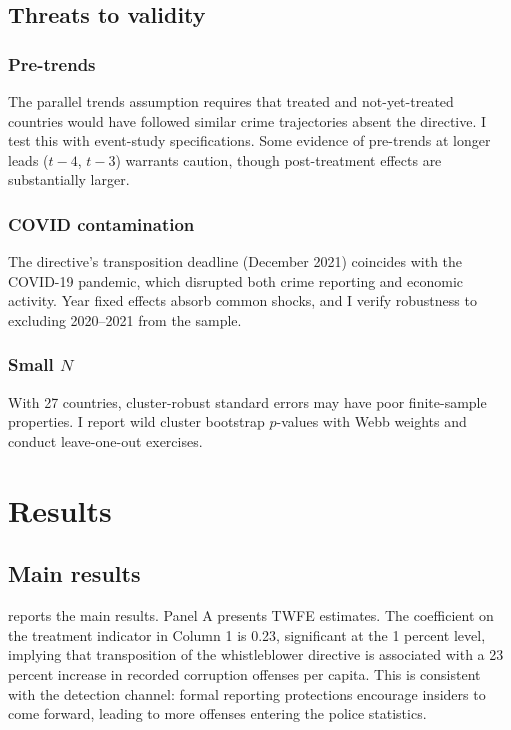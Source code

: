 \documentclass[12pt]{article}
\begin{document}
\subsection{Threats to validity}

\subsubsection*{Pre-trends} The parallel trends assumption requires that treated and not-yet-treated countries would have followed similar crime trajectories absent the directive. I test this with event-study specifications. Some evidence of pre-trends at longer leads ($t - 4$, $t - 3$) warrants caution, though post-treatment effects are substantially larger.

\subsubsection*{COVID contamination} The directive's transposition deadline (December 2021) coincides with the COVID-19 pandemic, which disrupted both crime reporting and economic activity. Year fixed effects absorb common shocks, and I verify robustness to excluding 2020--2021 from the sample.

\subsubsection*{Small $N$} With 27 countries, cluster-robust standard errors may have poor finite-sample properties. I report wild cluster bootstrap $p$-values with Webb weights \citep{cameron_gelbach_miller_2008, webb_2023} and conduct leave-one-out exercises.

\section{Results}

\subsection{Main results}



 reports the main results. Panel A presents TWFE estimates. The coefficient on the treatment indicator in Column 1 is 0.23, significant at the 1 percent level, implying that transposition of the whistleblower directive is associated with a 23 percent increase in recorded corruption offenses per capita. This is consistent with the detection channel: formal reporting protections encourage insiders to come forward, leading to more offenses entering the police statistics.
\end{document}
